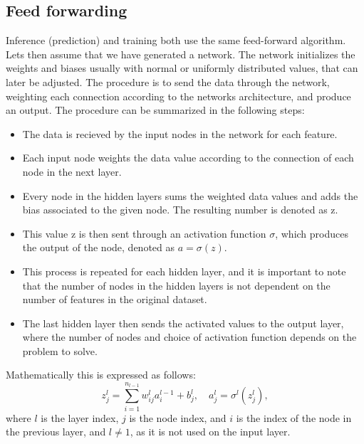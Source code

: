 \subsection*{Feed forwarding}
Inference (prediction) and training both use the same feed-forward algorithm. Lets then assume that we have generated a 
network. The network initializes the weights and biases usually with normal or uniformly distributed values, that can 
later be adjusted. The procedure is to send the data through the network, weighting each connection according to the networks 
architecture, and produce an output. The procedure can be summarized in the following steps\cite{FYSSTK}:
 \begin{itemize}
    \item The data is recieved by the input nodes in the network for each feature.
    \item Each input node weights the data value according to the connection of each node in the next layer.
    \item Every node in the hidden layers sums the weighted data values and adds the bias associated to the given node. The resulting number is denoted as z. 
    \item This value z is then sent through an activation function $\sigma$, which produces the output of the node, denoted as $a = \sigma(z)$.
    \item This process is repeated for each hidden layer, and it is important to note that the number of nodes in the hidden layers is not dependent on the number of features in the original dataset. 
    \item The last hidden layer then sends the activated values to the output layer, where the number of nodes and choice of activation function depends on the problem to solve.
 \end{itemize}

Mathematically this is expressed as follows:
\begin{equation}
    z_j^l = \sum_{i=1}^{n_{l-1}} w_{ij}^l a_i^{l-1} + b_j^l, \quad a_j^l = \sigma^l(z_j^l),
\end{equation}
where $l$ is the layer index, $j$ is the node index, and $i$ is the index of the node in the previous layer, 
and $l \neq 1$, as it is not used on the input layer.



